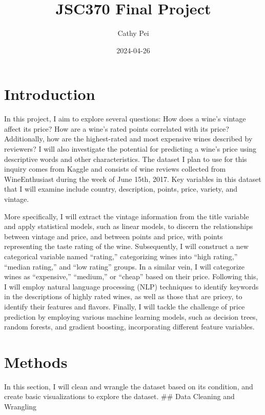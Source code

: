 \documentclass[
]{article}
\title{JSC370 Final Project}
\author{Cathy Pei}
\date{2024-04-26}
\begin{document}
\maketitle

\hypertarget{introduction}{%
\section{Introduction}\label{introduction}}

In this project, I aim to explore several questions: How does a wine's
vintage affect its price? How are a wine's rated points correlated with
its price? Additionally, how are the highest-rated and most expensive
wines described by reviewers? I will also investigate the potential for
predicting a wine's price using descriptive words and other
characteristics. The dataset I plan to use for this inquiry comes from
Kaggle and consists of wine reviews collected from WineEnthusiast during
the week of June 15th, 2017. Key variables in this dataset that I will
examine include country, description, points, price, variety, and
vintage.

More specifically, I will extract the vintage information from the title
variable and apply statistical models, such as linear models, to discern
the relationships between vintage and price, and between points and
price, with points representing the taste rating of the wine.
Subsequently, I will construct a new categorical variable named
``rating,'' categorizing wines into ``high rating,'' ``median rating,''
and ``low rating'' groups. In a similar vein, I will categorize wines as
``expensive,'' ``medium,'' or ``cheap'' based on their price. Following
this, I will employ natural language processing (NLP) techniques to
identify keywords in the descriptions of highly rated wines, as well as
those that are pricey, to identify their features and flavors. Finally,
I will tackle the challenge of price prediction by employing various
machine learning models, such as decision trees, random forests, and
gradient boosting, incorporating different feature variables.

\hypertarget{methods}{%
\section{Methods}\label{methods}}

In this section, I will clean and wrangle the dataset based on its
condition, and create basic visualizations to explore the dataset. \#\#
Data Cleaning and Wrangling
\end{document}
